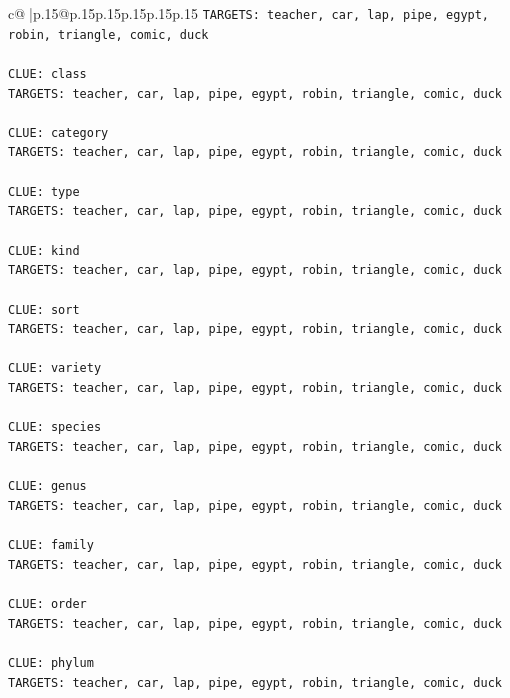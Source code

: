 \documentclass{article}
\begin{document}
{\begin{supertabular}{c@{$\;$}|p{.15\linewidth}@{}p{.15\linewidth}p{.15\linewidth}p{.15\linewidth}p{.15\linewidth}p{.15\linewidth}}
{{{\texttt{TARGETS: teacher, car, lap, pipe, egypt, robin, triangle, comic, duck} \\
\\ 
\texttt{CLUE: class} \\
\texttt{TARGETS: teacher, car, lap, pipe, egypt, robin, triangle, comic, duck} \\
\\ 
\texttt{CLUE: category} \\
\texttt{TARGETS: teacher, car, lap, pipe, egypt, robin, triangle, comic, duck} \\
\\ 
\texttt{CLUE: type} \\
\texttt{TARGETS: teacher, car, lap, pipe, egypt, robin, triangle, comic, duck} \\
\\ 
\texttt{CLUE: kind} \\
\texttt{TARGETS: teacher, car, lap, pipe, egypt, robin, triangle, comic, duck} \\
\\ 
\texttt{CLUE: sort} \\
\texttt{TARGETS: teacher, car, lap, pipe, egypt, robin, triangle, comic, duck} \\
\\ 
\texttt{CLUE: variety} \\
\texttt{TARGETS: teacher, car, lap, pipe, egypt, robin, triangle, comic, duck} \\
\\ 
\texttt{CLUE: species} \\
\texttt{TARGETS: teacher, car, lap, pipe, egypt, robin, triangle, comic, duck} \\
\\ 
\texttt{CLUE: genus} \\
\texttt{TARGETS: teacher, car, lap, pipe, egypt, robin, triangle, comic, duck} \\
\\ 
\texttt{CLUE: family} \\
\texttt{TARGETS: teacher, car, lap, pipe, egypt, robin, triangle, comic, duck} \\
\\ 
\texttt{CLUE: order} \\
\texttt{TARGETS: teacher, car, lap, pipe, egypt, robin, triangle, comic, duck} \\
\\ 
\texttt{CLUE: phylum} \\
\texttt{TARGETS: teacher, car, lap, pipe, egypt, robin, triangle, comic, duck} \\
}}}
\end{supertabular}}
\end{document}
